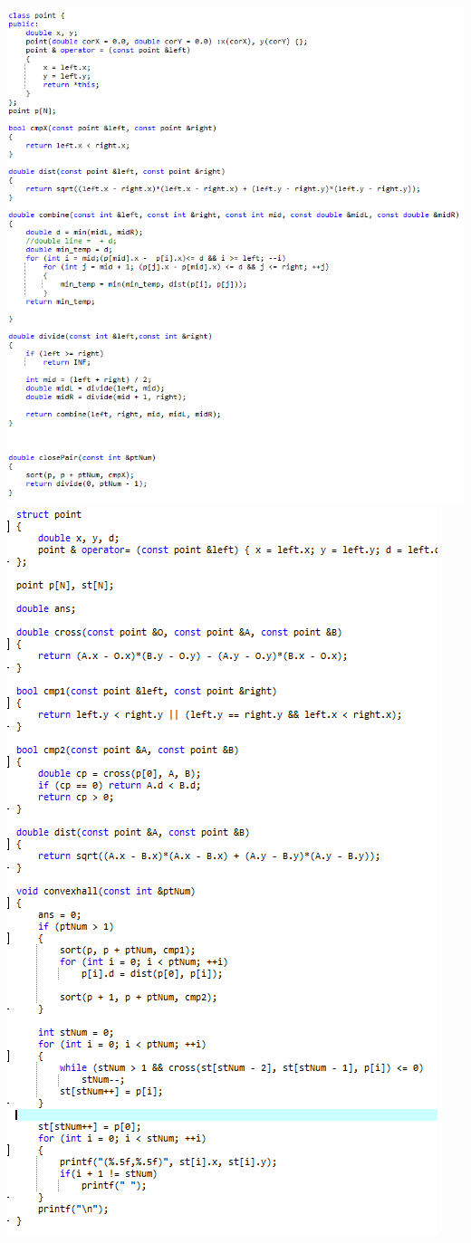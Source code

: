 \documentclass[a4paper, landscape, 8pt]{article}
\begin{document}
\includegraphics[]{ClosePair} \clearpage
\includegraphics[]{ConvaxHall} \clearpage
\end{document}
